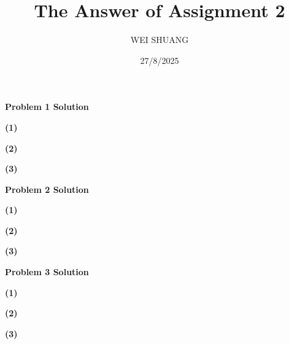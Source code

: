 \documentclass[12pt]{article}
\title{The Answer of Assignment 2}
\author{WEI SHUANG}
\date{27/8/2025}
\begin{document}
\maketitle

\begin{center}
    \textbf{Problem 1 Solution}
\end{center}

\textbf{(1)}

\textbf{(2)}

\textbf{(3)}


\begin{center}
    \textbf{Problem 2 Solution}
\end{center}

\textbf{(1)}

\textbf{(2)}

\textbf{(3)}

\begin{center}
    \textbf{Problem 3 Solution}
\end{center}

\textbf{(1)}

\textbf{(2)}

\textbf{(3)}
\end{document}
